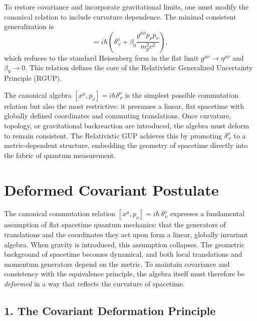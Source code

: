 \documentclass[11pt,oneside]{book}
\newenvironment{booknote}{
  \begin{tcolorbox}[
    colback=gray!3!white,
    colframe=gray!45!black,
    fonttitle=\bfseries,
    title=\textbf{Book Note},
  ]
}{\end{tcolorbox}}
\numberwithin{equation}{chapter}
\begin{document}
To restore covariance and incorporate gravitational limits, one must modify the canonical relation to include curvature dependence.  
The minimal consistent generalization is
\begin{equation}
[x^\mu,p_\nu] =
i\hbar\left(
\delta^\mu_{\ \nu}
+ \beta_0\frac{g^{\mu\rho}p_\rho p_\nu}{m_p^2 c^2}
\right),
\end{equation}
which reduces to the standard Heisenberg form in the flat limit $g^{\mu\nu}\to\eta^{\mu\nu}$ and $\beta_0\to0$.  
This relation defines the core of the Relativistic Generalized Uncertainty Principle (RGUP). \vspace{0.8em}

\begin{booknote}
The canonical algebra $[x^\mu,p_\nu]=i\hbar\delta^\mu_{\ \nu}$ is the simplest possible commutation relation but also the most restrictive: it presumes a linear, flat spacetime with globally defined coordinates and commuting translations.  
Once curvature, topology, or gravitational backreaction are introduced, the algebra must deform to remain consistent.  
The Relativistic GUP achieves this by promoting $\delta^\mu_{\ \nu}$ to a metric-dependent structure, embedding the geometry of spacetime directly into the fabric of quantum measurement.
\end{booknote}

\clearpage
\section{Deformed Covariant Postulate}

The canonical commutation relation $[x^\mu,p_\nu]=i\hbar\,\delta^\mu_{\ \nu}$ expresses a
fundamental assumption of flat spacetime quantum mechanics: that the generators of translations
and the coordinates they act upon form a linear, globally invariant algebra.
When gravity is introduced, this assumption collapses.  
The geometric background of spacetime becomes dynamical, and both
local translations and momentum generators depend on the metric.
To maintain covariance and consistency with the equivalence principle, 
the algebra itself must therefore be \emph{deformed} in a way that reflects the curvature of spacetime.

\subsection*{1. The Covariant Deformation Principle}
\end{document}
